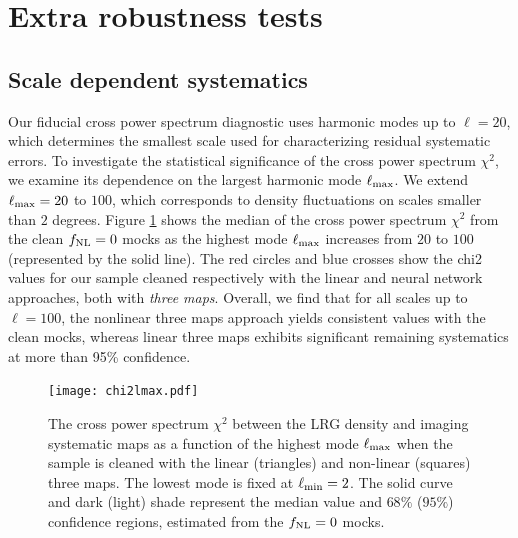 \section{Extra robustness tests}

\subsection{Scale dependent systematics}\label{sec:scalesys}
Our fiducial cross power spectrum diagnostic uses harmonic modes up to $\ell=20$, which determines the smallest scale used for characterizing residual systematic errors. To investigate the statistical significance of the cross power spectrum $\chi^{2}$, we examine its dependence on the largest harmonic mode $\ell_{\rm max}$. We extend $\ell_{\rm max}=20$ to $100$, which corresponds to density fluctuations on scales smaller than $2$ degrees. Figure \ref{fig:chi2cellextend} shows the median of the cross power spectrum $\chi^{2}$ from the clean $f_{\rm NL}=0$ mocks as the highest mode $\ell_{\rm max}$ increases from $20$ to $100$ (represented by the solid line). The red circles and blue crosses show the chi2 values for our sample cleaned respectively with the linear and neural network approaches, both with \textit{three maps}. Overall, we find that for all scales up to $\ell=100$, the nonlinear three maps approach yields consistent values with the clean mocks, whereas linear three maps exhibits significant remaining systematics at more than 95\% confidence.

\begin{figure}
\centering
\texttt{[image: chi2lmax.pdf]}
\caption{The cross power spectrum $\chi^{2}$ between the LRG density and imaging systematic maps as a function of the highest mode $\ell_{\rm max}$ when the sample is cleaned with the linear (triangles) and non-linear (squares) three maps. The lowest mode is fixed at $\ell_{\rm min}=2$. The solid curve and dark (light) shade represent the median value and $68\%$ ($95\%$) confidence regions, estimated from the $f_{\rm NL}=0$ mocks.}\label{fig:chi2cellextend}
\end{figure}



